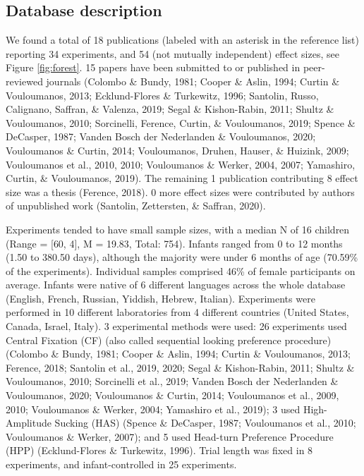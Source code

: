 \documentclass[man]{apa6}
\begin{document}
\hypertarget{database-description}{%
\subsection{Database description}\label{database-description}}

We found a total of 18 publications (labeled with an asterisk in the reference list) reporting 34 experiments, and 54 (not mutually independent) effect sizes, see Figure \ref{fig:forest}. 15 papers have been submitted to or published in peer-reviewed journals (Colombo \& Bundy, 1981; Cooper \& Aslin, 1994; Curtin \& Vouloumanos, 2013; Ecklund-Flores \& Turkewitz, 1996; Santolin, Russo, Calignano, Saffran, \& Valenza, 2019; Segal \& Kishon-Rabin, 2011; Shultz \& Vouloumanos, 2010; Sorcinelli, Ference, Curtin, \& Vouloumanos, 2019; Spence \& DeCasper, 1987; Vanden Bosch der Nederlanden \& Vouloumanos, 2020; Vouloumanos \& Curtin, 2014; Vouloumanos, Druhen, Hauser, \& Huizink, 2009; Vouloumanos et al., 2010, 2010; Vouloumanos \& Werker, 2004, 2007; Yamashiro, Curtin, \& Vouloumanos, 2019). The remaining 1 publication contributing 8 effect size was a thesis (Ference, 2018). 0 more effect sizes were contributed by authors of unpublished work (Santolin, Zettersten, \& Saffran, 2020).

Experiments tended to have small sample sizes, with a median N of 16 children (Range = {[}60, 4{]}, M = 19.83, Total: 754). Infants ranged from 0 to 12 months (1.50 to 380.50 days), although the majority were under 6 months of age (70.59\% of the experiments). Individual samples comprised 46\% of female participants on average. Infants were native of 6 different languages across the whole database (English, French, Russian, Yiddish, Hebrew, Italian).
Experiments were performed in 10 different laboratories from 4 different countries (United States, Canada, Israel, Italy). 3 experimental methods were used: 26 experiments used Central Fixation (CF) (also called sequential looking preference procedure) (Colombo \& Bundy, 1981; Cooper \& Aslin, 1994; Curtin \& Vouloumanos, 2013; Ference, 2018; Santolin et al., 2019, 2020; Segal \& Kishon-Rabin, 2011; Shultz \& Vouloumanos, 2010; Sorcinelli et al., 2019; Vanden Bosch der Nederlanden \& Vouloumanos, 2020; Vouloumanos \& Curtin, 2014; Vouloumanos et al., 2009, 2010; Vouloumanos \& Werker, 2004; Yamashiro et al., 2019); 3 used High-Amplitude Sucking (HAS) (Spence \& DeCasper, 1987; Vouloumanos et al., 2010; Vouloumanos \& Werker, 2007); and 5 used Head-turn Preference Procedure (HPP) (Ecklund-Flores \& Turkewitz, 1996). Trial length was fixed in 8 experiments, and infant-controlled in 25 experiments.
\end{document}
